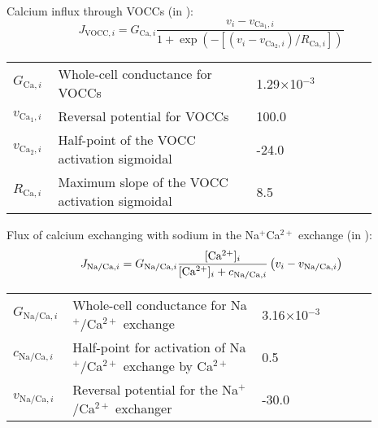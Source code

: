 Calcium influx through VOCCs (in \uMs): 
\begin{equation} \label{eq:JVOCCi}
J_{\text{VOCC},i} = G_{\text{Ca},i} \frac{v_{i}-v_{\text{Ca}_1,i}}     {1+ \exp(-\left[ \left(  v_{i}-v_{\text{Ca}_2,i}\right) /R_{\text{Ca},i}      \right] )}
\end{equation}
\begin{table}[h!]
\centering
\begin{tabular}{ p{0.09\linewidth}  >{\footnotesize} p{0.5\linewidth}  >{\footnotesize} p{0.27\linewidth} >{\footnotesize} p{0.03\linewidth} }
\hline
$G_{\text{Ca},i}$      	& Whole-cell conductance for VOCCs	 					& 1.29$\times$10$^{-3}$  \uMpmVs					& \cite{Koenigsberger2006} \\
$v_{\text{Ca}_1,i}$   & Reversal potential for VOCCs	 						& 100.0 \mV							& \cite{Koenigsberger2006} \\
$v_{\text{Ca}_2,i}$  	& Half-point of the VOCC activation sigmoidal		 	& -24.0 \mV							& \cite{Koenigsberger2006} \\
$R_{\text{Ca},i}$      	& Maximum slope of the VOCC	activation sigmoidal		& 8.5 \mV							& \cite{Koenigsberger2006} \\
\hline
\end{tabular}
\label{tab:JVOCCi}
\end{table}
\newpage
Flux of calcium exchanging with sodium in the Na$^{+}$Ca$^{2+}$ exchange (in \uMs): 
\begin{equation} \label{eq:JNaCai}
J_{\text{Na/Ca},i} = G_{\text{Na/Ca},i} \frac{\text{[Ca$^{2+}$]$_i$}}     {\text{[Ca$^{2+}$]$_i$} + c_{\text{Na/Ca},i}} \left( v_{i}-v_{\text{Na/Ca},i} \right)
\end{equation}
%
\begin{table}[h!]
\centering
\begin{tabular}{ p{0.09\linewidth}  >{\footnotesize} p{0.5\linewidth}  >{\footnotesize} p{0.27\linewidth} >{\footnotesize} p{0.03\linewidth} }
\hline
$G_{\text{Na/Ca},i}$   	& Whole-cell conductance for Na$^{+}$/Ca$^{2+}$ exchange			 		 & 3.16$\times$10$^{-3}$ \uMpmVs	& \cite{Koenigsberger2006} \\
$c_{\text{Na/Ca},i}$   	& Half-point for activation of Na$^{+}$/Ca$^{2+}$ exchange by Ca$^{2+}$		 & 0.5 \uM			& \cite{Koenigsberger2006} \\
$v_{\text{Na/Ca},i}$   	& Reversal potential for the Na$^{+}$/Ca$^{2+}$ exchanger					 & -30.0 \mV		& \cite{Koenigsberger2006} \\
\hline
\end{tabular}
\label{tab:JNaCai}
\end{table}
